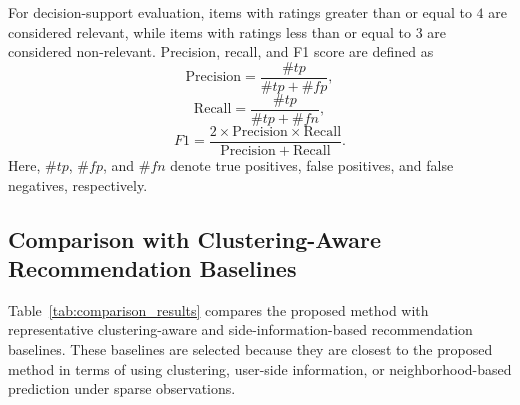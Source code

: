 \documentclass{article}
\theoremstyle{plain}
\theoremstyle{definition}
\theoremstyle{remark}
\begin{document}
For decision-support evaluation, items with ratings greater than or equal to \(4\) are considered relevant, while items with ratings less than or equal to \(3\) are considered non-relevant. Precision, recall, and F1 score are defined as
\[
\mathrm{Precision}
=
\frac{\#tp}{\#tp+\#fp},
\]
\[
\mathrm{Recall}
=
\frac{\#tp}{\#tp+\#fn},
\]
\[
F1
=
\frac{2\times \mathrm{Precision}\times \mathrm{Recall}}
{\mathrm{Precision}+\mathrm{Recall}}.
\]
Here, \(\#tp\), \(\#fp\), and \(\#fn\) denote true positives, false positives, and false negatives, respectively.

\subsection{Comparison with Clustering-Aware Recommendation Baselines}
\label{subsec:baseline_comparison}

Table~\ref{tab:comparison_results} compares the proposed method with representative clustering-aware and side-information-based recommendation baselines. These baselines are selected because they are closest to the proposed method in terms of using clustering, user-side information, or neighborhood-based prediction under sparse observations.
\end{document}
